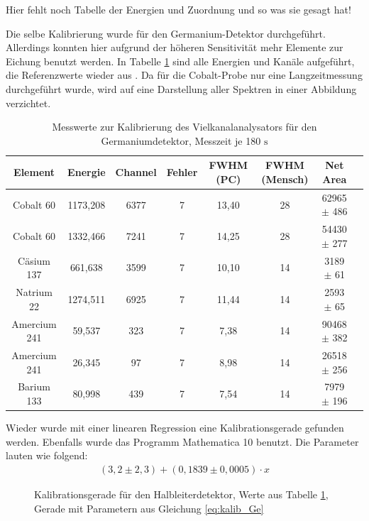 \documentclass[
	parskip=half,10pt,
	numbers= noenddot, %
	toc=flat, %
	oneside,
	twocolumn,
	]{scrartcl}
\begin{document}
Hier fehlt noch Tabelle der Energien und Zuordnung und so was sie gesagt hat!

Die selbe Kalibrierung wurde für den Germanium-Detektor durchgeführt. Allerdings konnten hier aufgrund der höheren Sensitivität mehr Elemente zur Eichung benutzt 
werden. In Tabelle \ref{tab:Kalib_Ge} sind alle Energien und Kanäle aufgeführt, die Referenzwerte wieder aus \cite{kohlrausch}. Da für die Cobalt-Probe nur eine 
Langzeitmessung durchgeführt wurde, wird auf eine Darstellung aller Spektren in einer Abbildung verzichtet. 

\begin{table}[t]
 \begin{tabular}{cccccccc}
Element & Energie & Channel & Fehler & FWHM (PC) & FWHM (Mensch) & Net Area \\
\hline
Cobalt 60    & 1173,208 & 6377 & 7 & 13,40 & 28 & 62965 $\pm$ 486 \\
Cobalt 60    & 1332,466 & 7241 & 7 & 14,25 & 28 & 54430 $\pm$ 277 \\
Cäsium 137   &  661,638 & 3599 & 7 & 10,10 & 14 &  3189 $\pm$  61 \\
Natrium 22   & 1274,511 & 6925 & 7 & 11,44 & 14 &  2593 $\pm$  65 \\
Amercium 241 &   59,537 &  323 & 7 &  7,38 & 14 & 90468 $\pm$ 382 \\
Amercium 241 &   26,345 &   97 & 7 &  8,98 & 14 & 26518 $\pm$ 256 \\
Barium 133   &   80,998 &  439 & 7 &  7,54 & 14 &  7979 $\pm$ 196
\end{tabular}
\caption{Messwerte zur Kalibrierung des Vielkanalanalysators für den Germaniumdetektor, Messzeit je 180 $\si{\second}$}
\label{tab:Kalib_Ge}
\end{table}

Wieder wurde mit einer linearen Regression eine Kalibrationsgerade gefunden werden. Ebenfalls wurde das Programm Mathematica 10 benutzt. 
Die Parameter lauten wie folgend:
\begin{align}
(3,2 \pm 2,3) + (0,1839 \pm 0,0005) \cdot x
\label{eq:kalib_Ge}
\end{align}


\begin{figure}[h]
\begin{center}
\end{center} 
\caption{Kalibrationsgerade für den Halbleiterdetektor, Werte aus Tabelle \ref{tab:Kalib_Ge}, Gerade mit Parametern aus Gleichung \ref{eq:kalib_Ge}}
\label{fig:Kalibrationsgerade_Ge}
\end{figure}
\end{document}
